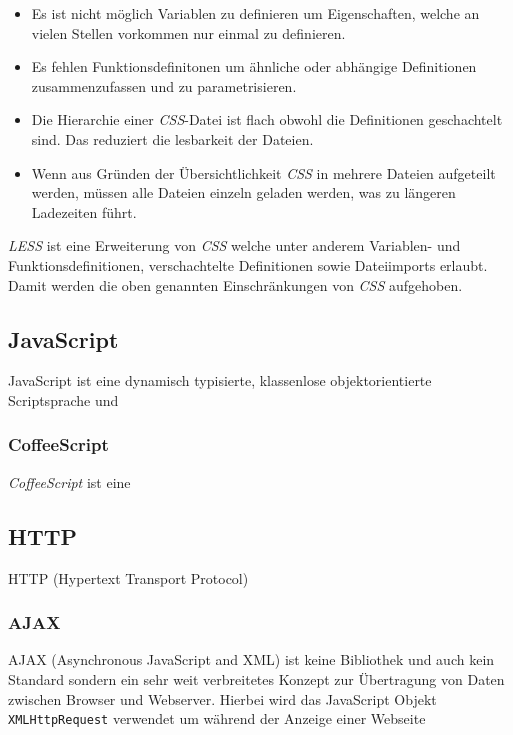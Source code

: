 \begin{itemize}
\item Es ist nicht möglich Variablen zu definieren um Eigenschaften, welche an 
vielen Stellen vorkommen nur einmal zu definieren.
\item Es fehlen Funktionsdefinitonen um ähnliche oder abhängige Definitionen 
zusammenzufassen und zu parametrisieren.
\item Die Hierarchie einer \textit{CSS}-Datei ist flach obwohl die Definitionen
geschachtelt sind. Das reduziert die lesbarkeit der Dateien.
\item Wenn aus Gründen der Übersichtlichkeit \textit{CSS} in mehrere Dateien
aufgeteilt werden, müssen alle Dateien einzeln geladen werden, was zu längeren
Ladezeiten führt.
\end{itemize}

\textit{LESS} ist eine Erweiterung von \textit{CSS} welche unter anderem 
Variablen- und Funktionsdefinitionen, verschachtelte Definitionen sowie 
Dateiimports erlaubt. Damit werden die oben genannten Einschränkungen von
\textit{CSS} aufgehoben.

\subsection{JavaScript}

JavaScript ist eine dynamisch typisierte, klassenlose objektorientierte 
Scriptsprache und 

\subsubsection{CoffeeScript}

\textit{CoffeeScript} ist eine

\subsection{HTTP}

HTTP (Hypertext Transport Protocol)

\subsubsection{AJAX}

AJAX (Asynchronous JavaScript and XML) ist keine Bibliothek und auch kein 
Standard sondern ein sehr weit verbreitetes Konzept zur Übertragung von Daten 
zwischen Browser und Webserver. Hierbei wird das JavaScript Objekt 
\texttt{XMLHttpRequest} verwendet um während der Anzeige einer Webseite 

